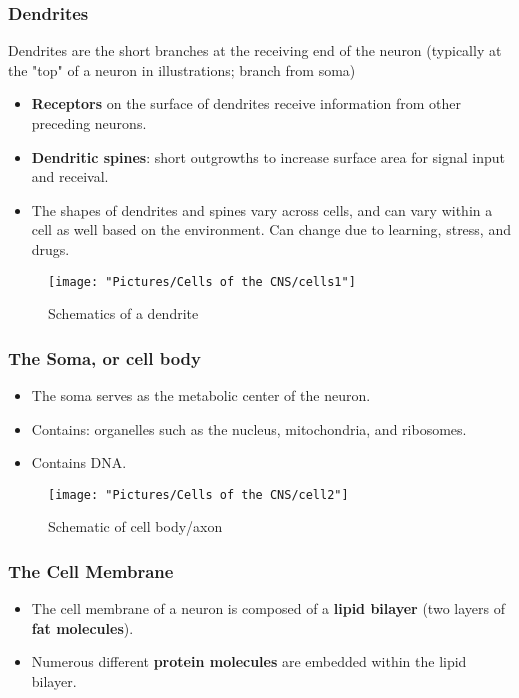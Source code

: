 \documentclass[12pt,a4paper]{article}
\begin{document}
	\subsubsection{Dendrites}
	
	Dendrites are the short branches at the receiving end of the neuron (typically at the "top" of a neuron in illustrations; branch from soma)
	
	\begin{itemize}
		\item \textbf{Receptors} on the surface of dendrites receive information from other preceding neurons. 
		\item \textbf{Dendritic spines}: short outgrowths to increase surface area for signal input and receival. 
		\item The shapes of dendrites and spines vary across cells, and can vary within a cell as well based on the environment. 
		\subitem Can change due to learning, stress, and drugs. 
	\end{itemize}
	
	
\begin{figure}
	\centering
	\texttt{[image: "Pictures/Cells of the CNS/cells1"]}
	\caption{Schematics of a dendrite}
	\label{fig:cells1}
\end{figure}
	
	\subsubsection{The Soma, or cell body}
	
	\begin{itemize}
		\item The soma serves as the metabolic center of the neuron. 
		\item Contains: organelles such as the nucleus, mitochondria, and ribosomes. 
		\item Contains DNA. 
	\end{itemize}
	
\begin{figure}
	\centering
	\texttt{[image: "Pictures/Cells of the CNS/cell2"]}
	\caption{Schematic of cell body/axon}
	\label{fig:cell2}
\end{figure}
	
	
	\subsubsection{The Cell Membrane}
	
	\begin{itemize}
		\item The cell membrane of a neuron is composed of a \textbf{lipid bilayer} (two layers of \textbf{fat molecules}).
		\item Numerous different \textbf{protein molecules} are embedded within the lipid bilayer. 
	\end{itemize}
	
\end{document}
